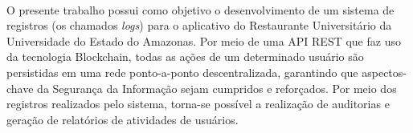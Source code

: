 \ \ \\[2cm]
O presente trabalho possui como objetivo o desenvolvimento de um sistema de registros (os chamados \emph{logs}) para o aplicativo do Restaurante Universitário da Universidade do Estado do Amazonas. Por meio de uma API REST que faz uso da tecnologia Blockchain, todas as ações de um determinado usuário são persistidas em uma rede ponto-a-ponto descentralizada, garantindo que aspectos-chave da Segurança da Informação sejam cumpridos e reforçados. Por meio dos registros realizados pelo sistema, torna-se possível a realização de auditorias e geração de relatórios de atividades de usuários.